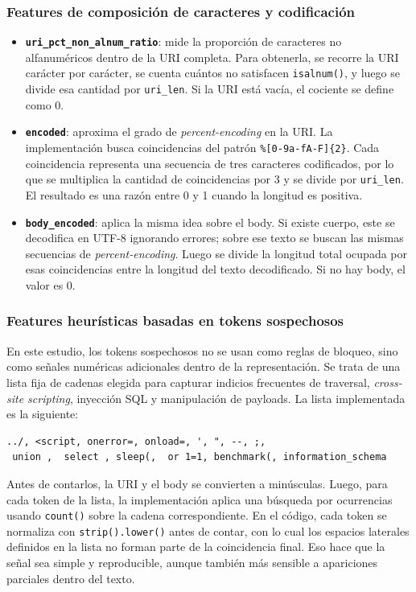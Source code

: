 \documentclass[12pt,oneside]{report}
\begin{document}
\subsubsection{Features de composición de caracteres y codificación}
\begin{itemize}[leftmargin=*]
  \item \textbf{\texttt{uri\_pct\_non\_alnum\_ratio}}: mide la proporción de caracteres no alfanuméricos dentro de la URI completa. Para obtenerla, se recorre la URI carácter por carácter, se cuenta cuántos no satisfacen \texttt{isalnum()}, y luego se divide esa cantidad por \texttt{uri\_len}. Si la URI está vacía, el cociente se define como 0.

  \item \textbf{\texttt{encoded}}: aproxima el grado de \textit{percent-encoding} en la URI. La implementación busca coincidencias del patrón \texttt{\%[0-9a-fA-F]\{2\}}. Cada coincidencia representa una secuencia de tres caracteres codificados, por lo que se multiplica la cantidad de coincidencias por 3 y se divide por \texttt{uri\_len}. El resultado es una razón entre 0 y 1 cuando la longitud es positiva.

  \item \textbf{\texttt{body\_encoded}}: aplica la misma idea sobre el body. Si existe cuerpo, este se decodifica en UTF-8 ignorando errores; sobre ese texto se buscan las mismas secuencias de \textit{percent-encoding}. Luego se divide la longitud total ocupada por esas coincidencias entre la longitud del texto decodificado. Si no hay body, el valor es 0.
\end{itemize}

\subsubsection{Features heurísticas basadas en tokens sospechosos}
En este estudio, los tokens sospechosos no se usan como reglas de bloqueo, sino como señales numéricas adicionales dentro de la representación. Se trata de una lista fija de cadenas elegida para capturar indicios frecuentes de traversal, \textit{cross-site scripting}, inyección SQL y manipulación de payloads. La lista implementada es la siguiente:

\begin{verbatim}
../, <script, onerror=, onload=, ', ", --, ;,
 union ,  select , sleep(,  or 1=1, benchmark(, information_schema
\end{verbatim}

Antes de contarlos, la URI y el body se convierten a minúsculas. Luego, para cada token de la lista, la implementación aplica una búsqueda por ocurrencias usando \texttt{count()} sobre la cadena correspondiente. En el código, cada token se normaliza con \texttt{strip().lower()} antes de contar, con lo cual los espacios laterales definidos en la lista no forman parte de la coincidencia final. Eso hace que la señal sea simple y reproducible, aunque también más sensible a apariciones parciales dentro del texto.
\end{document}
